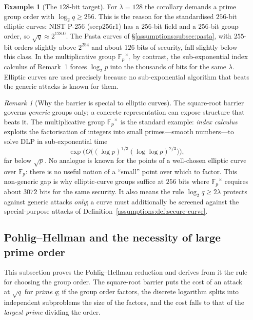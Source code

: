 \documentclass[11pt,a4paper]{article}
\theoremstyle{definition}
\newtheorem{example}[theorem]{Example}
\theoremstyle{remark}
\newtheorem{remark}[theorem]{Remark}
\newcommand{\Fp}{\ensuremath{\mathbb{F}_{p}}}
\begin{document}
\begin{example}[The \(128\)-bit target]
\label{assumptions:exa:128}
For \(\lambda = 128\) the corollary demands a prime group order with
\(\log_2 q \ge 256\). This is the reason for the standardised
\(256\)-bit elliptic curves: NIST P-256 (secp256r1) has a \(256\)-bit
field and a \(256\)-bit group order, so \(\sqrt q \approx 2^{128.0}\).
The Pasta curves of \S\ref{assumptions:subsec:pasta}, with \(255\)-bit
orders slightly above \(2^{254}\) and about \(126\) bits of security,
fall slightly below this class. In the multiplicative group
\(\Fp^{\times}\), by contrast, the sub-exponential index calculus of
Remark~\ref{assumptions:rem:index-calculus} forces \(\log_2 p\) into
the thousands of bits for the same \(\lambda\). Elliptic curves are
used precisely because no sub-exponential algorithm that beats the
generic attacks is known for them.
\end{example}

\begin{remark}[Why the barrier is special to elliptic curves]
\label{assumptions:rem:index-calculus}
The square-root barrier governs \emph{generic} groups only; a
concrete representation can expose structure that beats it. The
multiplicative group \(\Fp^{\times}\) is the standard example:
\emph{index calculus} exploits the factorisation of integers into
small primes---smooth numbers---to solve DLP in sub-exponential time
\[
\exp\!\bigl(O\bigl((\log p)^{1/3} (\log\log p)^{2/3}\bigr)\bigr),
\]
far below \(\sqrt p\). No analogue is known for the points of a
well-chosen elliptic curve over \(\Fp\): there is no useful notion of
a ``small'' point over which to factor. This non-generic gap is why
elliptic-curve groups suffice at \(256\) bits where \(\Fp^{\times}\)
requires about \(3072\) bits for the same security. It also means
the rule \(\log_2 q \ge 2\lambda\) protects against generic attacks
\emph{only}; a curve must additionally be screened against the
special-purpose attacks of
Definition~\ref{assumptions:def:secure-curve}.
\end{remark}

\subsection{Pohlig--Hellman and the necessity of large prime order}
\label{assumptions:subsec:pohlig}

This subsection proves the Pohlig--Hellman reduction and derives from it
the rule for choosing the group order. The square-root barrier puts the
cost of an attack at \(\sqrt q\) for \emph{prime} \(q\); if the group
order factors, the discrete logarithm splits into independent
subproblems the size of the factors, and the cost falls to that of the
\emph{largest prime} dividing the order.
\end{document}
